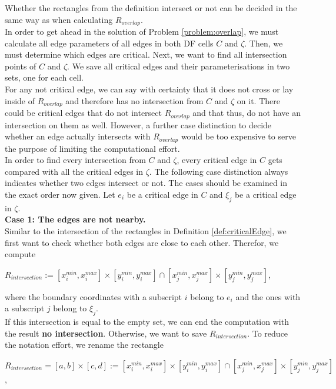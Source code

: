\documentclass[a4paper,12pt,leqno]{article}
\theoremstyle{plain}
\theoremstyle{remark}
\begin{document}
Whether the rectangles from the definition intersect or not can be decided in the same way as when calculating $R_{overlap}$. \\
In order to get ahead in the solution of Problem \ref{problem:overlap}, we must calculate all edge parameters of all edges in both DF cells $C$ and $\zeta$. Then, we must determine which edges are critical. Next, we want to find all intersection points of  $C$ and $\zeta$. We save all critical edges and their parameterisations in two sets, one for each cell. \\
For any not critical edge, we can say with certainty that it does not cross or lay inside of $R_{overlap}$ and therefore has no intersection from $C$ and $\zeta$ on it. There could be critical edges that do not intersect $R_{overlap}$ and that thus, do not have an intersection on them as well. However, a further case distinction to decide whether an edge actually intersects with $R_{overlap}$ would be too expensive to serve the purpose of limiting the computational effort. \\
In order to find every intersection from $C$ and $\zeta$, every critical edge in $C$ gets compared with all the critical edges in $\zeta$. The following case distinction always indicates whether two edges intersect or not. The cases should be examined in the exact order now given. Let $e_i$ be a critical edge in $C$ and $\xi_j$ be a critical edge in $\zeta$. \\
\textbf{Case 1: The edges are not nearby.}\\
Similar to the intersection of the rectangles in Definition \ref{def:criticalEdge}, we first want to check whether both edges are close to each other. Therefor, we compute 
\begin{center}
	$R_{intersection} := [x_{i}^{min}, x_{i}^{max}] \times [y_{i}^{min}, y_{i}^{max}] \cap  [x_{j}^{min}, x_{j}^{max}] \times [y_{j}^{min}, y_{j}^{max}] $, 
\end{center}
where the boundary coordinates with a subscript $i$ belong to $e_i$ and the ones with a subscript $j$ belong to $\xi_j$. \\
If this intersection is equal to the empty set, we can end the computation with the result \textbf{no intersection}. Otherwise, we want to save $R_{intersection}$. To reduce the notation effort, we rename the rectangle
\begin{center}
	$R_{intersection} = [a, b] \times [c, d] := [x_{i}^{min}, x_{i}^{max}] \times [y_{i}^{min}, y_{i}^{max}] \cap  [x_{j}^{min}, x_{j}^{max}] \times [y_{j}^{min}, y_{j}^{max}] $,
\end{center}
\end{document}
